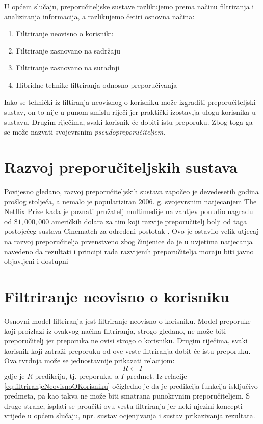 \documentclass[times, utf8, diplomski, numeric]{fer}
\begin{document}
U općem slučaju, preporučiteljske sustave razlikujemo prema načinu filtriranja i
analiziranja informacija, a razlikujemo četiri osnovna načina:
\begin{enumerate}
  \item Filtriranje neovisno o korisniku 
  \item Filtriranje zasnovano na sadržaju 
  \item Filtriranje zasnovano na suradnji 
  \item Hibridne tehnike filtriranja odnosno preporučivanja
\end{enumerate}
Iako se tehnički iz filtiranja neovisnog o korisniku može izgraditi
preporučiteljski sustav, on to nije u punom smislu riječi jer praktički
izostavlja ulogu korisnika u sustavu. Drugim riječima, svaki korisnik će dobiti
istu preporuku. Zbog toga ga se može nazvati svojevrsnim
\emph{pseudopreporučiteljem}.

\section{Razvoj preporučiteljskih sustava}
Povijesno gledano, razvoj preporučiteljskih sustava započeo je devedesetih
godina prošlog stoljeća, a nemalo je populariziran $2006$. g. svojevrsnim
natjecanjem \glqq The Netflix Prize \grqq kada je poznati pružatelj multimedije
na zahtjev ponudio nagradu od \$$1,000,000$ američkih dolara za tim koji razvije
preporučitelj bolji od taga postojećeg sustava \glqq Cinematch \grqq za određeni
postotak \cite{Bennett2007}.
Ovo je ostavilo velik utjecaj na razvoj preporučitelja prvenstveno zbog
činjenice da je u uvjetima natjecanja navedeno da rezultati i principi rada
razvijenih preporučitelja moraju biti javno objavljeni i dostupni

\section{Filtriranje neovisno o korisniku}
Osnovni model filtriranja jest filtriranje neovisno o korisniku. Model preporuke
koji proizlazi iz ovakvog načina filtriranja, strogo gledano, ne može biti
preporučitelj jer preporuka ne ovisi strogo o korisniku. Drugim riječima, svaki
korisnik koji zatraži preporuku od ove vrste filtriranja dobit će istu
preporuku. Ova tvrdnja može se jednostavnije prikazati relacijom:
\begin{equation}
\label{eq:filtriranjeNeovisnoOKorisniku}
	R \leftarrow I
\end{equation}
gdje je $R$ predikcija, tj. preporuka, a $I$ predmet. Iz relacije
\ref{eq:filtriranjeNeovisnoOKorisniku} očigledno je da je predikcija funkcija
isključivo predmeta, pa kao takva ne može biti smatrana punokrvnim
preporučiteljem. S druge strane, isplati se proučiti ovu vrstu filtriranja jer
neki njezini koncepti vrijede u općem slučaju, npr. sustav ocjenjivanja i sustav
prikazivanja rezultata.
\end{document}
